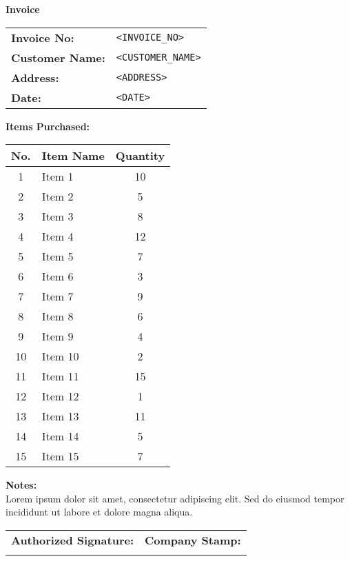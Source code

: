 \documentclass{article}
\begin{document}
\begin{center}
    {\Huge \textbf{Invoice}} \\[1em]
\end{center}

\noindent
\begin{tabular}{@{}ll@{}}
    \textbf{Invoice No:} & \texttt{<INVOICE\_NO>} \\
    \textbf{Customer Name:} & \texttt{<CUSTOMER\_NAME>} \\
    \textbf{Address:} & \texttt{<ADDRESS>} \\
    \textbf{Date:} & \texttt{<DATE>} \\
\end{tabular}

\vspace{2em}

\textbf{Items Purchased:} \\

\begin{tabular}{|c|l|c|}
    \hline
    \textbf{No.} & \textbf{Item Name} & \textbf{Quantity} \\
    \hline
    1 & Item 1 & 10 \\
    \hline
    2 & Item 2 & 5 \\
    \hline
    3 & Item 3 & 8 \\
    \hline
    4 & Item 4 & 12 \\
    \hline
    5 & Item 5 & 7 \\
    \hline
    6 & Item 6 & 3 \\
    \hline
    7 & Item 7 & 9 \\
    \hline
    8 & Item 8 & 6 \\
    \hline
    9 & Item 9 & 4 \\
    \hline
    10 & Item 10 & 2 \\
    \hline
    11 & Item 11 & 15 \\
    \hline
    12 & Item 12 & 1 \\
    \hline
    13 & Item 13 & 11 \\
    \hline
    14 & Item 14 & 5 \\
    \hline
    15 & Item 15 & 7 \\
    \hline
\end{tabular}

\vspace{2em}

\noindent
\textbf{Notes:} \\
Lorem ipsum dolor sit amet, consectetur adipiscing elit. Sed do eiusmod tempor incididunt ut labore et dolore magna aliqua.

\vspace{1em}

\noindent
\begin{tabular}{@{}p{}p{}@{}}
    \textbf{Authorized Signature:} & \textbf{Company Stamp:} \\
    \vspace{2cm} & \vspace{2cm} \\
\end{tabular}
\end{document}
